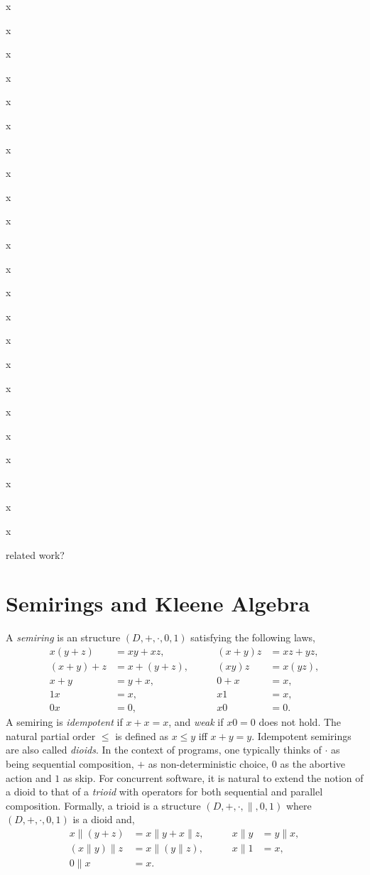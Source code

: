 \documentclass{llncs}
\begin{document}
x

x

x

x

x

x

x

x

x

x

x

x

x

x

x

x

x

x

x

x

x

x

x

related work?

\newpage
\section{Semirings and Kleene Algebra}
\label{sec:KA}

A \emph{semiring} is an structure
$(D,+,\cdot,0,1)$ satisfying the following laws,
\begin{align*}
  x(y + z) &= xy + xz, &\qquad (x + y)z &= xz + yz,\\
  (x + y) + z &= x + (y + z), &\qquad (xy)z &= x(yz),\\
  x + y &= y + x, &\qquad 0 + x &= x,\\
  1x &= x, &\qquad x1 &= x,\\
  0x &= 0, &\qquad x0 &= 0.
\end{align*}
A semiring is \emph{idempotent} if $x + x = x$, and \emph{weak} if $x0
= 0$ does not hold. The natural partial order $\le$ is defined as $x
\le y $ iff $x + y = y$. Idempotent semirings are also called
\emph{dioids}. In the context of programs, one typically thinks of
$\cdot$ as being sequential composition, $+$ as non-deterministic
choice, $0$ as the abortive action and $1$ as skip. For concurrent
software, it is natural to extend the notion of a dioid to that of a
\emph{trioid} with operators for both sequential and parallel
composition. Formally, a trioid is a structure $(D,+,\cdot,\|,0,1)$
where $(D,+,\cdot,0,1)$ is a dioid and,
\begin{align*}
  x\|(y + z) &= x\|y + x\|z, &\qquad x\|y &= y\|x,\\
  (x\|y)\|z &= x\|(y\|z), &\qquad x\|1 &= x,\\
  0\|x &= x.
\end{align*}
\end{document}

